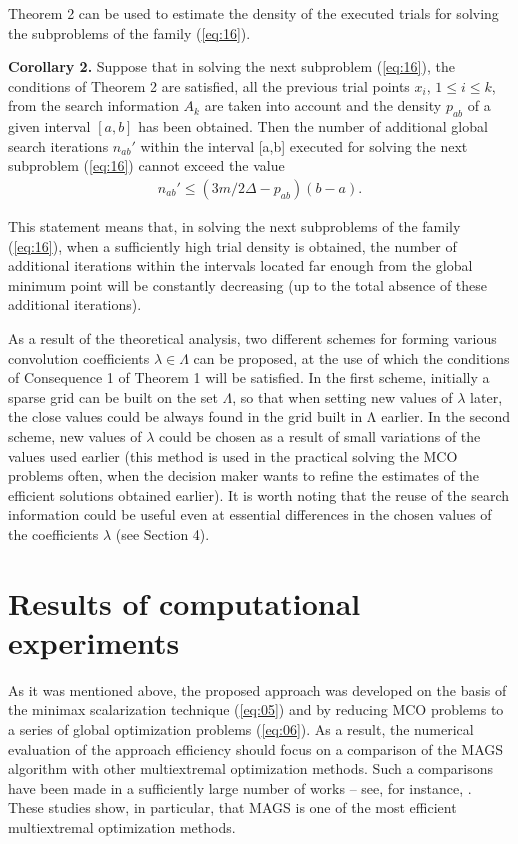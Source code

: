 \documentclass[smallcondensed]{svjour3}     %
\begin{document}
Theorem 2 can be used to estimate the density of the executed trials for solving the subproblems of the family (\ref{eq:16}).

{\bf Corollary 2.} Suppose that in solving the next subproblem (\ref{eq:16}), the conditions of Theorem 2 are satisfied, all  the previous trial points $x_i$, $1 \leq i \leq k$, from the search information $A_k$ are taken into account and the density $p_{ab}$ of a given interval $[a,b]$ has been obtained. Then the number of additional global search iterations  $n_{ab}'$ within the interval [a,b] executed for solving the next subproblem (\ref{eq:16}) cannot exceed the value 
\begin{eqnarray*}
n_{ab}' \leq (3 m / 2 \Delta - p_{ab} )(b-a)  .
\end{eqnarray*}
 
This statement means that, in solving the next subproblems of the family (\ref{eq:16}), when a sufficiently high trial density is obtained, the number of additional iterations within the intervals located far enough from the global minimum point will be constantly decreasing (up to the total absence of these additional iterations).\par

As a result of the theoretical analysis, two different schemes for forming various convolution coefficients $\lambda \in \Lambda$ can be proposed, at the use of which the conditions of Consequence 1 of Theorem 1 will be satisfied. In the first scheme, initially a sparse grid can be built on the set $\Lambda$, so that when setting new values of $\lambda$ later, the close values could be always found in the grid built in Λ earlier. In the second scheme, new values of $\lambda$ could be chosen as a result of small variations of the values used earlier (this method is used in the practical solving the MCO problems often, when the decision maker wants to refine the estimates of the efficient solutions obtained earlier). It is worth noting that the reuse of the search information could be useful even at essential differences in the chosen values of the coefficients $\lambda$ (see Section 4).

\section{Results of computational experiments}
As it was mentioned above, the proposed approach was developed on the basis of the minimax scalarization technique (\ref{eq:05}) and by reducing MCO problems to a series of global optimization problems (\ref{eq:06}). As a result, the numerical evaluation of the approach efficiency should focus on a comparison of the MAGS algorithm with other multiextremal optimization methods. Such a comparisons have been made in a sufficiently large number of works -- see, for instance, \cite{c1,c2,c3,c16,c18,c20,c25,c31,c32,c33,c35}. These studies show, in particular, that MAGS is one of the most efficient multiextremal optimization methods.\par
\end{document}
